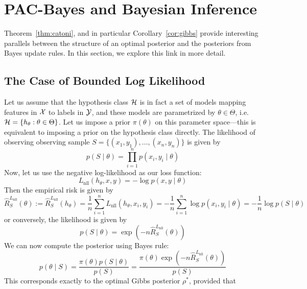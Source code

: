 \section{PAC-Bayes and Bayesian Inference}

Theorem~\ref{thm:catoni}, and in particular Corollary~\ref{cor:gibbs} provide
interesting parallels between the structure of an optimal posterior and the
posteriors from Bayes update rules. In this section, we explore this link in
more detail.

\subsection{The Case of Bounded Log Likelihood}

Let us assume that the hypothesis class $\mathcal{H}$ is in fact a set of models mapping
features in $\mathcal{X}$ to labels in $\mathcal{Y}$, and these models are parametrized by
$\theta \in \Theta$, i.e.\ $\mathcal{H} = \{h_\theta : \theta \in \Theta\}$. Let us
impose a prior $\pi(\theta)$ on this parameter space---this is equivalent to
imposing a prior on the hypothesis class directly. The likelihood of observing
observing sample $S = \{(x_1, y_1), \ldots, (x_n, y_n)\}$ is given by
\begin{equation}
  p(S \mid \theta) = \prod_{i = 1}^n p(x_i, y_i \mid \theta)
\end{equation}
Now, let us use the negative log-likelihood as our loss function:
\begin{equation}
  L_\text{nll}(h_\theta, x, y) = - \log p(x, y \mid \theta)
\end{equation}
Then the empirical risk is given by
\begin{equation}
  \hat{R}_S^{L_\text{nll}}(\theta) := \hat{R}_S^{L_\text{nll}}(h_\theta) =
  \frac{1}{n} \sum_{i = 1}^n L_\text{nll}(h_\theta, x_i, y_i) = -\frac{1}{n}
  \sum_{i = 1}^n \log p(x_i, y_i \mid \theta) = - \frac{1}{n} \log p(S \mid
  \theta)
\end{equation}
or conversely, the likelihood is given by
\begin{equation}
  p(S \mid \theta) = \exp(-n \hat{R}_S^{L_\text{nll}}(\theta))
\end{equation}
We can now compute the posterior using Bayes rule:
\begin{equation}
  p(\theta \mid S) = \frac{\pi(\theta) p(S \mid \theta)}{p(S)} =
  \frac{\pi(\theta) \exp(-n \hat{R}_S^{L_\text{nll}}(\theta))}{p(S)}
\end{equation}
This corresponds exactly to the optimal Gibbs posterior $\rho^*$, provided that
